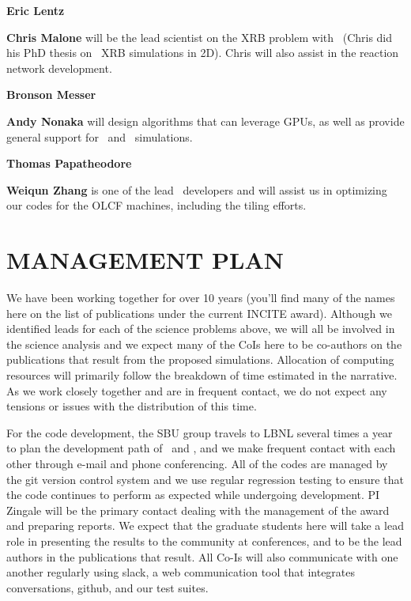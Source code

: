 \documentclass[11pt,letterpaper,english]{article}
\begin{document}
\begin{tightitem}
\item {\bf Eric Lentz}

\item {\bf Chris Malone} will be the lead scientist on the XRB problem
  with \maestro\ (Chris did his PhD thesis on \maestro\ XRB simulations
  in 2D).  Chris will also assist in the reaction network development.

\item {\bf Bronson Messer}

\item {\bf Andy Nonaka} will design algorithms that can leverage GPUs,
  as well as provide general support for \maestro\ and \castro\ simulations.

\item {\bf Thomas Papatheodore}

\item {\bf Weiqun Zhang} is one of the lead \boxlib\ developers and will
  assist us in optimizing our codes for the OLCF machines, including the
  tiling efforts.

\end{tightitem} 

\section{MANAGEMENT PLAN}

We have been working together for over 10 years (you'll find many of
the names here on the list of publications under the current INCITE
award).  Although we identified leads for each of the science problems
above, we will all be involved in the science analysis and we expect
many of the CoIs here to be co-authors on the publications that result
from the proposed simulations.  Allocation of computing resources will
primarily follow the breakdown of time estimated in the narrative.  As
we work closely together and are in frequent contact, we do not expect
any tensions or issues with the distribution of this time.

For the code development, the SBU group travels to LBNL several times
a year to plan the development path of \maestro\ and \castro, and we
make frequent contact with each other through e-mail and phone
conferencing.  All of the codes are managed by the git version control
system and we use regular regression testing to ensure that the code
continues to perform as expected while undergoing development.  PI
Zingale will be the primary contact dealing with the management of the
award and preparing reports.  We expect that the graduate students
here will take a lead role in presenting the results to the community
at conferences, and to be the lead authors in the publications that
result.  All Co-Is will also communicate with one another regularly
using {\sf slack}, a web communication tool that integrates
conversations, github, and our test suites.
\end{document}
